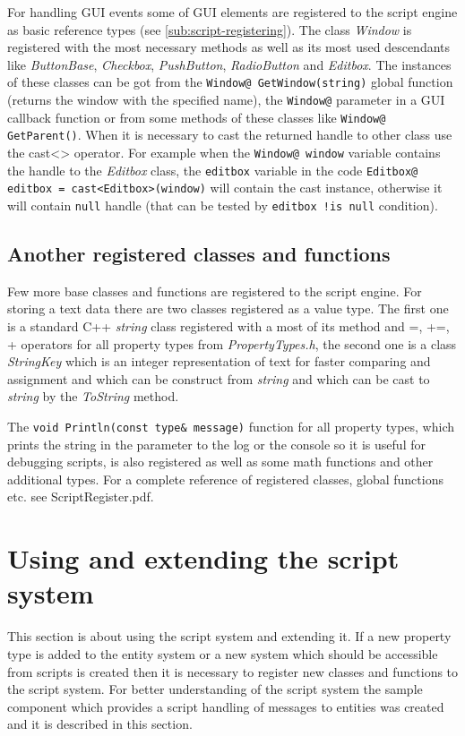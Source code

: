 For handling GUI events some of GUI elements are registered to the script engine as basic reference types (see \ref{sub:script-registering}). The class \emph{Window} is registered with the most necessary methods as well as its most used descendants like \emph{ButtonBase}, \emph{Checkbox}, \emph{PushButton}, \emph{RadioButton} and \emph{Editbox}. The instances of these classes can be got from the \verb/Window@ GetWindow(string)/ global function (returns the window with the specified name), the \verb/Window@/ parameter in a GUI callback function or from some methods of these classes like \verb/Window@ GetParent()/. When it is necessary to cast the returned handle to other class use the cast<> operator. For example when the \verb/Window@ window/ variable contains the handle to the \emph{Editbox} class, the \verb/editbox/ variable in the code \verb/Editbox@ editbox = cast<Editbox>(window)/ will contain the cast instance, otherwise it will contain \verb/null/ handle (that can be tested by \verb/editbox !is null/ condition).

\subsection{Another registered classes and functions}
\label{sub:script-registered}

Few more base classes and functions are registered to the script engine. For storing a text data there are two classes registered as a value type. The first one is a standard C++ \emph{string} class registered with a most of its method and =, +=, + operators for all property types from \emph{PropertyTypes.h}, the second one is a class \emph{StringKey} which is an integer representation of text for faster comparing and assignment and which can be construct from \emph{string} and which can be cast to \emph{string} by the \emph{ToString} method.

The \verb/void Println(const type& message)/ function for all property types, which prints the string in the parameter to the log or the console so it is useful for debugging scripts, is also registered as well as some math functions and other additional types. For a complete reference of registered classes, global functions etc. see ScriptRegister.pdf.

\section{Using and extending the script system}

This section is about using the script system and extending it. If a new property type is added to the entity system or a new system which should be accessible from scripts is created then it is necessary to register new classes and functions to the script system. For better understanding of the script system the sample component which provides a script handling of messages to entities was created and it is described in this section.

